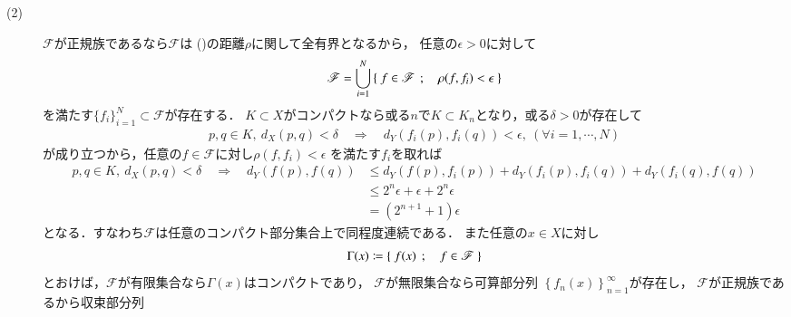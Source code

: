 \begin{prf}
\begin{description}
			\item[(2)] 
				$\mathscr{F}$が正規族であるなら$\mathscr{F}$は
				()の距離$\rho$に関して全有界となるから，
				任意の$\epsilon > 0$に対して
				\begin{align}
					\mathscr{F}
					= \bigcup_{i=1}^N \left\{\ f \in \mathscr{F}\ \, ; \quad \rho(f,f_i) < \epsilon\ \right\}
				\end{align}
				を満たす$\{f_i\}_{i=1}^N \subset \mathscr{F}$が存在する．
				$K \subset X$がコンパクトなら或る$n$で$K \subset K_n$となり，或る$\delta > 0$が存在して
				\begin{align}
					p,q \in K,\ d_X(p,q) < \delta
					\quad \Longrightarrow \quad
					d_Y(f_i(p),f_i(q)) < \epsilon,\ (\forall i = 1,\cdots,N)
				\end{align}
				が成り立つから，任意の$f \in \mathscr{F}$に対し$\rho(f,f_i) < \epsilon$
				を満たす$f_i$を取れば
				\begin{align}
					p,q \in K,\ d_X(p,q) < \delta
					\quad \Longrightarrow \quad
					d_Y(f(p),f(q)) 
					&\leq d_Y(f(p),f_i(p)) + d_Y(f_i(p),f_i(q)) + d_Y(f_i(q),f(q)) \\
					&\leq 2^n \epsilon + \epsilon + 2^n \epsilon \\
					&= (2^{n+1} + 1)\epsilon
				\end{align}
				となる．すなわち$\mathscr{F}$は任意のコンパクト部分集合上で同程度連続である．
				また任意の$x \in X$に対し
				\begin{align}
					\Gamma(x) \coloneqq \left\{\ f(x)\ \, ; \quad f \in \mathscr{F}\ \right\}
				\end{align}
				とおけば，$\mathscr{F}$が有限集合なら$\Gamma(x)$はコンパクトであり，
				$\mathscr{F}$が無限集合なら可算部分列
				$\left\{f_n(x)\right\}_{n=1}^\infty$が存在し，
				$\mathscr{F}$が正規族であるから収束部分列$$
		\end{description}
	\end{prf}